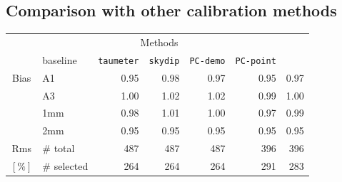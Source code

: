 \subsection{Comparison with other calibration methods}
\label{se:photometry_others}

\begin{table}[!htbp]
\begin{center}
\begin{tabular}{clrrrrr}
  \hline\hline
  \noalign{\smallskip}
  \multicolumn{2}{c}{}  &  \multicolumn{5}{c}{Methods} \\\cline{3-7}
  \noalign{\smallskip}
  \multicolumn{2}{c}{Characteristics} &  baseline  & {\small {\tt taumeter}}  & {\small {\tt skydip}}  &  {\small {\tt PC-demo}} & {\small {\tt PC-point}} \\
  \hline
  \noalign{\smallskip}
  Bias &  A1            &   0.95   &  0.98    &  0.97    &   0.95    &  0.97  \\
       &  A3            &   1.00   &  1.02    &  1.02    &   0.99    &  1.00  \\
       &  1mm           &   0.98   &  1.01    &  1.00    &   0.97    &  0.99  \\
       &  2mm           &   0.95   &  0.95    &  0.95    &   0.95    &  0.95  \\
  \hline
  \noalign{\smallskip}
  Rms  &  $\#$ total    &   487    &    487   &    487    &    396    &  396 \\
  $[\%]$ &  $\#$ selected &   264    &    264   &    264    &    291    &  283 \\

\end{tabular}
\end{center}
\end{table}
